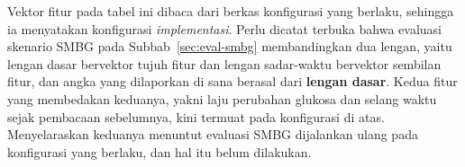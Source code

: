 \begin{table}[htbp]
\vspace{0.4em}
{\tabnotestyle Vektor fitur pada tabel ini dibaca dari berkas konfigurasi yang berlaku, sehingga ia menyatakan konfigurasi \emph{implementasi}. Perlu dicatat terbuka bahwa evaluasi skenario SMBG pada Subbab~\ref{sec:eval-smbg} membandingkan dua lengan, yaitu lengan dasar bervektor tujuh fitur dan lengan sadar-waktu bervektor sembilan fitur, dan angka yang dilaporkan di sana berasal dari \textbf{lengan dasar}. Kedua fitur yang membedakan keduanya, yakni laju perubahan glukosa dan selang waktu sejak pembacaan sebelumnya, kini termuat pada konfigurasi di atas. Menyelaraskan keduanya menuntut evaluasi SMBG dijalankan ulang pada konfigurasi yang berlaku, dan hal itu belum dilakukan.\par}
\end{table}
